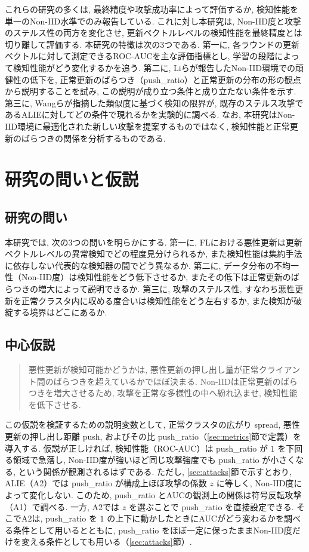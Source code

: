 \documentclass[a4j, twocolumn, dvipdfmx]{jsarticle}
\newcommand{\PushRatio}{\textrm{push\_ratio}}
\newcommand{\Spread}{\textrm{spread}}
\newcommand{\Push}{\textrm{push}}
\begin{document}
これらの研究の多くは, 最終精度や攻撃成功率によって評価するか, 検知性能を単一のNon-IID水準でのみ報告している. これに対し本研究は, Non-IID度と攻撃のステルス性の両方を変化させ, 更新ベクトルレベルの検知性能を最終精度とは切り離して評価する. 本研究の特徴は次の3つである. 第一に, 各ラウンドの更新ベクトルに対して測定できるROC-AUCを主な評価指標とし, 学習の段階によって検知性能がどう変化するかを追う. 第二に, Liら\cite{li2023experimental}が報告したNon-IID環境での頑健性の低下を, 正常更新のばらつき（\PushRatio{}）と正常更新の分布の形の観点から説明することを試み, この説明が成り立つ条件と成り立たない条件を示す. 第三に, Wangら\cite{wang2023trust}が指摘した類似度に基づく検知の限界が, 既存のステルス攻撃であるALIEに対してどの条件で現れるかを実験的に調べる. なお, 本研究はNon-IID環境に最適化された新しい攻撃を提案するものではなく, 検知性能と正常更新のばらつきの関係を分析するものである.

\section{研究の問いと仮説}
\label{sec:rq}

\subsection{研究の問い}

本研究では, 次の3つの問いを明らかにする. 第一に, FLにおける悪性更新は更新ベクトルレベルの異常検知でどの程度見分けられるか, また検知性能は集約手法に依存しない代表的な検知器の間でどう異なるか. 第二に, データ分布の不均一性（Non-IID度）は検知性能をどう低下させるか, またその低下は正常更新のばらつきの増大によって説明できるか. 第三に, 攻撃のステルス性, すなわち悪性更新を正常クラスタ内に収める度合いは検知性能をどう左右するか, また検知が破綻する境界はどこにあるか.

\subsection{中心仮説}

\begin{quote}
悪性更新が検知可能かどうかは, 悪性更新の押し出し量が正常クライアント間のばらつきを超えているかでほぼ決まる. Non-IIDは正常更新のばらつきを増大させるため, 攻撃を正常な多様性の中へ紛れ込ませ, 検知性能を低下させる.
\end{quote}

この仮説を検証するための説明変数として, 正常クラスタの広がり \Spread{}, 悪性更新の押し出し距離 \Push{}, およびその比 \PushRatio{}（\ref{sec:metrics}節で定義）を導入する. 仮説が正しければ, 検知性能（ROC-AUC）は \PushRatio{} が $1$ を下回る領域で急落し, Non-IID度が強いほど同じ攻撃強度でも \PushRatio{} が小さくなる, という関係が観測されるはずである. ただし, \ref{sec:attacks}節で示すとおり, ALIE（A2）では \PushRatio{} が構成上ほぼ攻撃の係数 $z$ に等しく, Non-IID度によって変化しない. このため, \PushRatio{} とAUCの観測上の関係は符号反転攻撃（A1）で調べる. 一方, A2では $z$ を選ぶことで \PushRatio{} を直接設定できる. そこでA2は, \PushRatio{} を $1$ の上下に動かしたときにAUCがどう変わるかを調べる条件として用いるとともに, \PushRatio{} をほぼ一定に保ったままNon-IID度だけを変える条件としても用いる（\ref{sec:attacks}節）.
\end{document}
